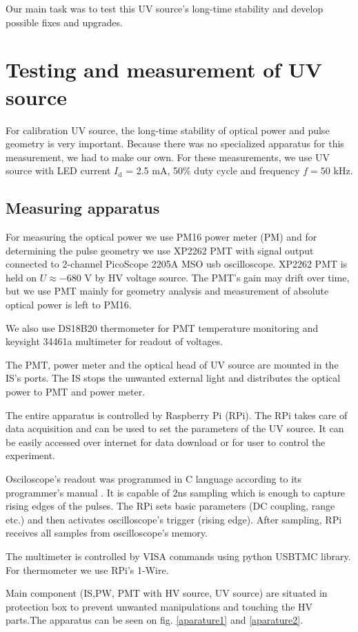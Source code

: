 Our main task was to test this UV source's long-time stability and develop possible fixes and upgrades.


\section{Testing and measurement of UV source}
For calibration UV source, the long-time stability of optical power and pulse geometry is very important. Because there was no specialized apparatus for this measurement, we had to make our own. For these measurements, we use UV source with LED current $I_{\textrm{d}}$ = 2.5 mA, 50$\%$ duty cycle and frequency $f = 50$ kHz. 
\subsection{Measuring apparatus}
For measuring the optical power we use PM16 power meter (PM) and for determining the pulse geometry we use XP2262 PMT with signal output connected to 2-channel PicoScope 2205A MSO usb oscilloscope. XP2262 PMT is held on $U \approx -680$ V by HV voltage source. The PMT's gain may drift over time, but we use PMT mainly for geometry analysis and measurement of absolute optical power is left to PM16.
\par
We also use DS18B20 thermometer for PMT temperature monitoring and keysight 34461a multimeter for readout of voltages.

\par
The PMT, power meter and the optical head of UV source are mounted in the IS's ports. The IS stops the unwanted external light and distributes the optical power to PMT and power meter. 
\par
The entire apparatus is controlled by Raspberry Pi (RPi). The RPi takes care of data acquisition and can be used to set the parameters of the UV source. It can be easily accessed over internet for data download or for user to control the experiment.
\par
Osciloscope's readout was programmed in C language according to its programmer's manual \cite{PicoScope}. It is capable of 2ns sampling which is enough to capture rising edges of the pulses. The RPi sets basic parameters (DC coupling, range etc.) and then activates oscilloscope's trigger (rising edge). After sampling, RPi receives all samples from oscilloscope's memory.
\par
The multimeter is controlled by VISA commands using python USBTMC library. For thermometer we use RPi's 1-Wire.
\par
Main component (IS,PW, PMT with HV source, UV source) are situated in protection box to prevent unwanted manipulations and touching the HV parts.The apparatus can be seen on fig. \ref{aparature1} and \ref{aparature2}.

